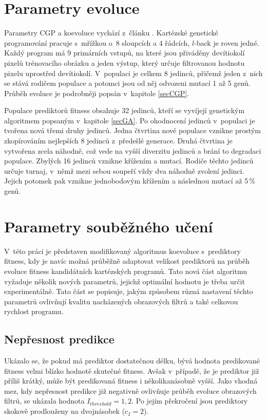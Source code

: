 \section{Parametry evoluce}

Parametry CGP a koevoluce vychází z~článku \cite{SikuPPSN}. Kartézské genetické programování pracuje s~mřížkou o~8 sloupcích a 4 řádcích, $l$-back je roven jedné. Každý program má 9 primárních vstupů, na které jsou přiváděny devítiokolí pixelů trénovacího obrázku a jeden výstup, který určuje filtrovanou hodnotu pixelu uprostřed devítiokolí. V~populaci je celkem 8 jedinců, přičemž jeden z~nich se stává rodičem populace a potomci jsou od něj odvozeni mutací 1 až 5 genů. Průběh evoluce je podrobněji popsán v~kapitole \ref{secCGP}.

Populace prediktorů fitness obsahuje 32 jedinců, kteří se vyvíjejí genetickým algoritmem popsaným v~kapitole \ref{secGA}. Po ohodnocení jedinců v~populaci je tvořena nová třemi druhy jedinců. Jedna čtvrtina nové populace vznikne prostým zkopírováním nejlepších 8 jedinců z~předešlé generace. Druhá čtvrtina je vytvořena zcela náhodně, což vede na vyšší diverzitu jedinců a brání to degradaci populace. Zbylých 16 jedinců vznikne křížením a mutací. Rodiče těchto jedinců určuje turnaj, v~němž mezi sebou soupeří vždy dva náhodně zvolení jedinci. Jejich potomek pak vznikne jednobodovým křížením a následnou mutací až 5\,\% genů.

\section{Parametry souběžného učení}

V~této práci je představen modifikovaný algoritmus koevoluce s~prediktory fitness, kdy je navíc možná průběžně adaptovat velikost prediktorů na průběh evoluce fitness kandidátních kartézských programů. Tato nová část algoritmu vyžaduje několik nových parametrů, jejichž optimální hodnotu je třeba určit experimentálně. Tato část se popisuje, jakým způsobem různá nastavení těchto parametrů ovlivňují kvalitu nacházených obrazových filtrů a také celkovou rychlost programu.

\subsection{Nepřesnost predikce}

Ukázalo se, že pokud má prediktor dostatečnou délku, bývá hodnota predikované fitness velmi blízko hodnotě skutečné fitness. Avšak v~případě, že je prediktor již příliš krátký, může být predikovaná fitness i několikanásobně vyšší. Jako vhodná mez, kdy nepřesnost predikce již negativně ovlivňuje průběh evoluce obrazových filtrů, se ukázala hodnota $I_\mathit{threshold} = 1,2$. Po jejím překročení jsou prediktory skokově prodlouženy na dvojnásobek ($c_I = 2$).

